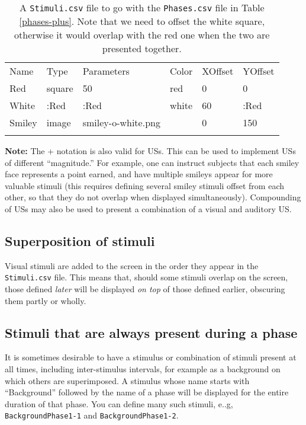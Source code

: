 \documentclass[11pt,]{article}
\renewcommand{\medskip}{}
\begin{document}
\begin{longtable}[c]{@{}llllll@{}}
\hline\noalign{\medskip}
Name & Type & Parameters & Color & XOffset & YOffset
\\\noalign{\medskip}
\hline\noalign{\medskip}
Red & square & 50 & red & 0 & 0
\\\noalign{\medskip}
White & :Red & :Red & white & 60 & :Red
\\\noalign{\medskip}
Smiley & image & smiley-o-white.png & & 0 & 150
\\\noalign{\medskip}
\hline
\noalign{\medskip}
\caption{A \texttt{Stimuli.csv} file to go with the \texttt{Phases.csv}
file in Table \ref{phases-plus}. Note that we need to offset the white
square, otherwise it would overlap with the red one when the two are
presented together. \label{stimuli-plus}}
\end{longtable}

\textbf{Note:} The + notation is also valid for USs. This can be used to
implement USs of different ``magnitude.'' For example, one can instruct
subjects that each smiley face represents a point earned, and have
multiple smileys appear for more valuable stimuli (this requires
defining several smiley stimuli offset from each other, so that they do
not overlap when displayed simultaneously). Compounding of USs may also
be used to present a combination of a visual and auditory US.

\subsection{Superposition of stimuli}

Visual stimuli are added to the screen in the order they appear in the
\texttt{Stimuli.csv} file. This means that, should some stimuli overlap
on the screen, those defined \emph{later} will be displayed \emph{on
top} of those defined earlier, obscuring them partly or wholly.

\subsection{Stimuli that are always present during a phase}

It is sometimes desirable to have a stimulus or combination of stimuli
present at all times, including inter-stimulus intervals, for example as
a background on which others are superimposed. A stimulus whose name
starts with ``Background'' followed by the name of a phase will be
displayed for the entire duration of that phase. You can define many
such stimuli, e..g, \texttt{BackgroundPhase1-1} and
\texttt{BackgroundPhase1-2}.
\end{document}
